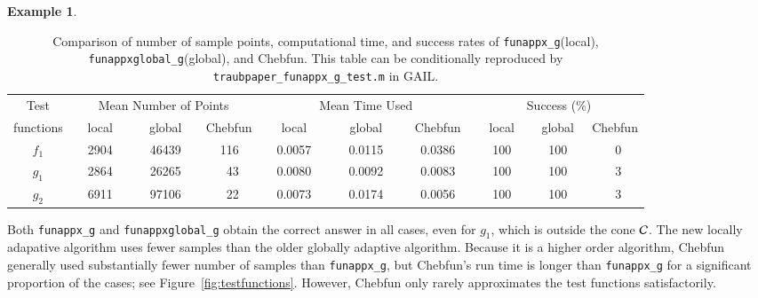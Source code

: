 \documentclass[review]{elsarticle}
\theoremstyle{definition}
\newtheorem{exmp}{Example}
\newcommand{\funappxg}{\texttt{funappx\_g}\xspace}
\newcommand{\funappxglobalg}{\texttt{funappxglobal\_g}\xspace}
\begin{document}
\begin{exmp}
%
\begin{table}[bt]
\centering
\caption{Comparison of number of sample points, computational time,  and success
rates of \funappxg (local), \funappxglobalg (global), and Chebfun.
This table can be conditionally reproduced by
\texttt{traubpaper\_funappx\_g\_test.m} in GAIL.}
\label{tab:localVsGlobalVsChebfun}
{\footnotesize
\setlength{\tabcolsep}{.3em} %
		\begin{tabular}{ccrccrccrccrccrccrccrccrccrc}		
			Test      &    \multicolumn{9}{c}{Mean Number of Points}   & \multicolumn{9}{c}{Mean Time Used}  & \multicolumn{9}{c}{Success (\%)}
			\\  functions &  \multicolumn{3}{c}{local}  &  \multicolumn{3}{c}{global }  &  \multicolumn{3}{c}{Chebfun }  & \multicolumn{3}{c}{local}  &  \multicolumn{3}{c}{global }  &  \multicolumn{3}{c}{Chebfun } & \multicolumn{3}{c}{local}  &  \multicolumn{3}{c}{global }  &  \multicolumn{3}{c}{Chebfun }
\\ \toprule
          $f_1$   &&   2904  &&&   46439   &&&   116    &&&   0.0057   &&&     0.0115    &&&   0.0386 &&&    100   &&&  100   &&&  0
\\        $g_1$   &&   2864  &&&   26265   &&&    43    &&&   0.0080   &&&     0.0092    &&&   0.0083 &&&    100   &&&  100   &&&  3
\\        $g_2$   &&   6911  &&&   97106   &&&    22    &&&   0.0073   &&&     0.0174    &&&   0.0056 &&&    100   &&&  100    &&&  3  	
\end{tabular}
}
\end{table}
%

Both \funappxg{} and \funappxglobalg{} obtain the correct answer in all cases,
even for $g_1$, which is outside the cone $\mathcal{C}$. The new locally adapative
algorithm uses fewer samples than the older globally adaptive algorithm. Because it is a higher order algorithm, Chebfun generally used substantially fewer number of samples than
\funappxg, but Chebfun's run time is longer than \funappxg for a
significant proportion of the cases; see Figure~\ref{fig:testfunctions}. However, Chebfun only rarely
approximates the test functions satisfactorily.



\end{exmp}
\end{document}
